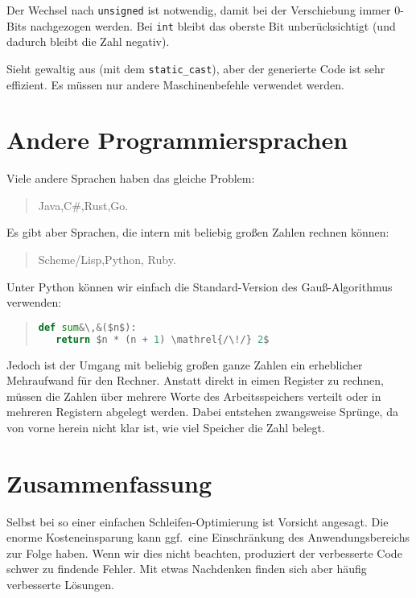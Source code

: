 \documentclass[a5paper,landscape,ngerman,10pt]{article}
\begin{document}
Der Wechsel nach \lstinline!unsigned! ist notwendig, damit
bei der Verschiebung immer $0$-Bits nachgezogen werden.
Bei \lstinline!int! bleibt das oberste Bit unberücksichtigt
(und dadurch bleibt die Zahl negativ).

Sieht gewaltig aus (mit dem \lstinline!static_cast!), aber
der generierte Code ist sehr effizient.
Es müssen nur andere Maschinenbefehle verwendet werden.

\section{Andere Programmiersprachen}

Viele andere Sprachen haben das gleiche Problem:

\begin{quotation}
 Java,\qquad C\#,\qquad Rust,\qquad Go.
\end{quotation}

Es gibt aber Sprachen, die intern mit beliebig großen
Zahlen rechnen können:

\begin{quotation}
 Scheme/Lisp,\qquad Python, \qquad Ruby.
\end{quotation}

Unter Python können wir einfach die Standard-Version
des Gauß-Algorithmus verwenden:

\begin{quotation}
\begin{lstlisting}[language=Python]
def sum&\,&($n$):
   return $n * (n + 1) \mathrel{/\!/} 2$
\end{lstlisting}
\end{quotation}

Jedoch ist der Umgang mit beliebig großen ganze Zahlen
ein erheblicher Mehraufwand für den Rechner.
Anstatt direkt in eimen Register zu rechnen, müssen die
Zahlen über mehrere Worte des Arbeitsspeichers verteilt
oder in mehreren Registern abgelegt werden.
Dabei entstehen zwangsweise Sprünge, da von vorne herein
nicht klar ist, wie viel Speicher die Zahl belegt.

\section{Zusammenfassung}

Selbst bei so einer einfachen Schleifen-Optimierung ist
Vorsicht angesagt.
Die enorme Kosteneinsparung kann ggf.\ eine Einschränkung
des Anwendungsbereichs zur Folge haben.
Wenn wir dies nicht beachten, produziert der verbesserte
Code schwer zu findende Fehler.
Mit etwas Nachdenken finden sich aber häufig verbesserte
Lösungen.
\end{document}
